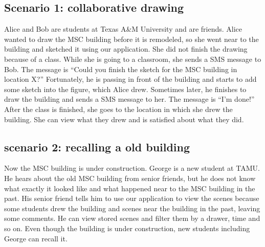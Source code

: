 \documentclass{article}
\begin{document}
\subsection{Scenario 1: collaborative drawing}

Alice and Bob are students at Texas A\&M University and are friends. Alice
wanted to draw the MSC building before it is remodeled, so she went near to the
building and sketched it using our application. She did not finish the drawing
because of a class. While she is going to a classroom, she sends a SMS message
to Bob. The message is ``Could you finish the sketch for the MSC building in
location X?'' Fortunately, he is passing in front of the building and starts to
add some sketch into the figure, which Alice drew. Sometimes later, he finishes
to draw the building and sends a SMS message to her. The message is ``I'm
done!'' After the class is finished, she goes to the location in which she drew
the building. She can view what they drew and is satisfied about what they did.

\subsection{scenario 2: recalling a old building}

Now the MSC building is under construction. George is a new student at TAMU. He
hears about the old MSC building from senior friends, but he does not know what
exactly it looked like and what happened near to the MSC building in the past.
His senior friend tells him to use our application to view the scenes because
some students drew the building and scenes near the building in the past,
leaving some comments. He can view stored scenes and filter them by a drawer,
time and so on. Even though the building is under construction, new students
including George can recall it.





 
\end{document}
